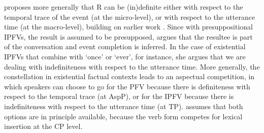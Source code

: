 \documentclass[output=paper,colorlinks,citecolor=brown]{langscibook}
\begin{document}
\citet{klimek22} proposes more generally that R can be (in)definite either with respect to the temporal trace of the event (at the micro-level), or with respect to the utterance time (at the macro-level), building on earlier work \citep[][]{klimek20}. %
Since with presuppositional IPFVs, the result is assumed to be presupposed, \citet{klimek20} argues that the resultee is part of the conversation and event completion is inferred. %
In the case of existential IPFVs that combine with `once' or `ever', for instance, she argues that we are dealing with indefiniteness with respect to the utterance time. More generally, the constellation in existential factual contexts leads to an aspectual competition, in which speakers can choose to go for the PFV because there is definiteness with respect to the temporal trace (at AspP), or for the IPFV because there is indefiniteness with respect to the utterance time (at TP). \citet{klimek20} assumes that both options are in principle available, because the verb form competes for lexical insertion at the CP level. %
\end{document}

